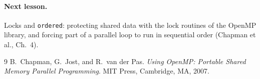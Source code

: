 \documentclass[11pt,a4paper]{article}
\begin{document}
\paragraph{Next lesson.} Locks and \texttt{ordered}: protecting shared data with the lock
routines of the OpenMP library, and forcing part of a parallel loop to run in sequential
order (Chapman et al., Ch.~4).

\begin{thebibliography}{9}
 B.~Chapman, G.~Jost, and R.~van der Pas. \emph{Using OpenMP: Portable
  Shared Memory Parallel Programming}. MIT Press, Cambridge, MA, 2007.
\end{thebibliography}
\end{document}
